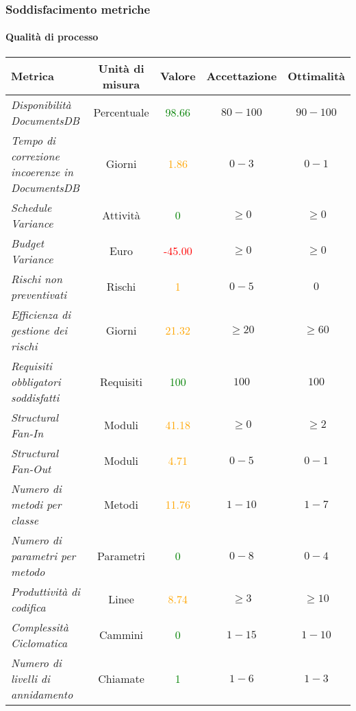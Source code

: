 \subsubsection{Soddisfacimento metriche}

\paragraph{Qualità di processo}
\begin{longtable}{|>{\centering}m{5cm}|c|c|c|c|}
\hline
\textbf{Metrica} & \textbf{Unità di misura} & \textbf{Valore} & \textbf{Accettazione} & \textbf{Ottimalità}\\
\hline
\endhead
\emph{Disponibilità DocumentsDB} & {Percentuale} & \textcolor{Green}{98.66} & $80 - 100$ & $90 - 100$\\ \hline
\emph{Tempo di correzione incoerenze in DocumentsDB} & {Giorni} & \textcolor{Orange}{1.86} & $0 - 3$ & $0 - 1$\\ \hline
\emph{Schedule Variance} & {Attività} & \textcolor{Green}{0} & $\geq 0$  & $\geq 0$\\ \hline
\emph{Budget Variance} & {Euro} & \textcolor{Red}{-45.00} & $\geq 0$ & $\geq 0$\\ \hline
\emph{Rischi non preventivati} & {Rischi} & \textcolor{Orange}{1} & $0 - 5$ & $0$\\ \hline
\emph{Efficienza di gestione dei rischi} & {Giorni} & \textcolor{Orange}{21.32} & $\geq 20$ & $\geq 60$\\ \hline
\emph{Requisiti obbligatori soddisfatti} & {Requisiti} & \textcolor{Green}{100} & $100$ & $100$\\ \hline
\emph{Structural Fan-In} & {Moduli} & \textcolor{Orange}{41.18} & $\geq 0$ & $\geq 2$\\ \hline
\emph{Structural Fan-Out} & {Moduli} & \textcolor{Orange}{4.71} & $0 - 5$ & $0 - 1$\\ \hline
\emph{Numero di metodi per classe} & {Metodi} & \textcolor{Orange}{11.76} & $1 - 10$ & $1 - 7$\\ \hline
\emph{Numero di parametri per metodo} & {Parametri} & \textcolor{Green}{0} & $0 - 8$ & $0 - 4$\\ \hline
\emph{Produttività di codifica} & {Linee} & \textcolor{Orange}{8.74} & $\geq 3$ & $\geq 10$\\ \hline
\emph{Complessità Ciclomatica} & {Cammini} & \textcolor{Green}{0} & $1 - 15$ & $1 - 10$\\ \hline
\emph{Numero di livelli di annidamento} & {Chiamate} & \textcolor{Green}{1} & $1 - 6$ & $1 - 3$\\ \hline

\end{longtable}
